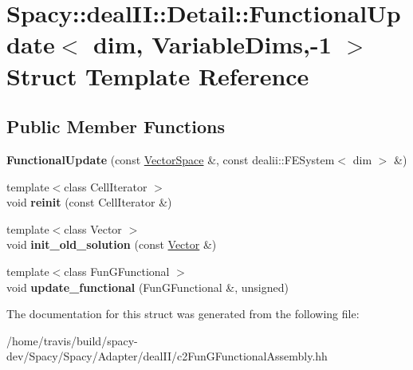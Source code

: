\hypertarget{structSpacy_1_1dealII_1_1Detail_1_1FunctionalUpdate_3_01dim_00_01VariableDims_00-1_01_4}{\section{Spacy\-:\-:deal\-I\-I\-:\-:Detail\-:\-:Functional\-Update$<$ dim, Variable\-Dims,-\/1 $>$ Struct Template Reference}
\label{structSpacy_1_1dealII_1_1Detail_1_1FunctionalUpdate_3_01dim_00_01VariableDims_00-1_01_4}
}
\subsection*{Public Member Functions}
\begin{DoxyCompactItemize}
\item 
\hypertarget{structSpacy_1_1dealII_1_1Detail_1_1FunctionalUpdate_3_01dim_00_01VariableDims_00-1_01_4_ae7f013437fda0696ad3c981735075517}{{\bfseries Functional\-Update} (const \hyperlink{classSpacy_1_1VectorSpace}{Vector\-Space} \&, const dealii\-::\-F\-E\-System$<$ dim $>$ \&)}\label{structSpacy_1_1dealII_1_1Detail_1_1FunctionalUpdate_3_01dim_00_01VariableDims_00-1_01_4_ae7f013437fda0696ad3c981735075517}

\item 
\hypertarget{structSpacy_1_1dealII_1_1Detail_1_1FunctionalUpdate_3_01dim_00_01VariableDims_00-1_01_4_af881bed8138aa08f2d8e4a143b72d754}{{\footnotesize template$<$class Cell\-Iterator $>$ }\\void {\bfseries reinit} (const Cell\-Iterator \&)}\label{structSpacy_1_1dealII_1_1Detail_1_1FunctionalUpdate_3_01dim_00_01VariableDims_00-1_01_4_af881bed8138aa08f2d8e4a143b72d754}

\item 
\hypertarget{structSpacy_1_1dealII_1_1Detail_1_1FunctionalUpdate_3_01dim_00_01VariableDims_00-1_01_4_ab5215daf743ba2a2015682a908c798d3}{{\footnotesize template$<$class Vector $>$ }\\void {\bfseries init\-\_\-old\-\_\-solution} (const \hyperlink{group__VectorSpaceGroup_ga65d64ee5f22f492639d0f950aa931071}{Vector} \&)}\label{structSpacy_1_1dealII_1_1Detail_1_1FunctionalUpdate_3_01dim_00_01VariableDims_00-1_01_4_ab5215daf743ba2a2015682a908c798d3}

\item 
\hypertarget{structSpacy_1_1dealII_1_1Detail_1_1FunctionalUpdate_3_01dim_00_01VariableDims_00-1_01_4_a87697cd4d5aa227da5ca27a814793dc5}{{\footnotesize template$<$class Fun\-G\-Functional $>$ }\\void {\bfseries update\-\_\-functional} (Fun\-G\-Functional \&, unsigned)}\label{structSpacy_1_1dealII_1_1Detail_1_1FunctionalUpdate_3_01dim_00_01VariableDims_00-1_01_4_a87697cd4d5aa227da5ca27a814793dc5}

\end{DoxyCompactItemize}


The documentation for this struct was generated from the following file\-:\begin{DoxyCompactItemize}
\item 
/home/travis/build/spacy-\/dev/\-Spacy/\-Spacy/\-Adapter/deal\-I\-I/c2\-Fun\-G\-Functional\-Assembly.\-hh\end{DoxyCompactItemize}

